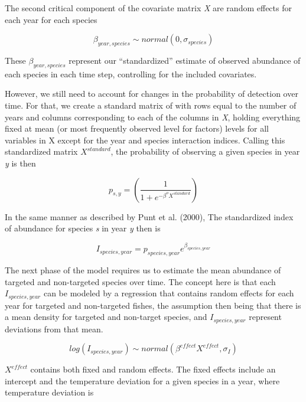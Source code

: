 \documentclass[]{article}
\begin{document}
The second critical component of the covariate matrix \emph{X} are random effects for each year for each species

\begin{equation}
  \beta_{year,species} \sim normal(0,\sigma_{species})
  \label{eq:species}
\end{equation}

These \(\beta_{year,species}\) represent our ``standardized'' estimate of observed abundance of each species in each time step, controlling for the included covariates.

However, we still need to account for changes in the probability of detection over time. For that, we create a standard matrix of with rows equal to the number of years and columns corresponding to each of the columns in \emph{X}, holding everything fixed at mean (or most frequently observed level for factors) levels for all variables in X except for the year and species interaction indices. Calling this standardized matrix \(X^{standard}\), the probability of observing a given species in year \emph{y} is then

\begin{equation}
p_{s,y} = (\frac{1}{1 +e^{-\beta^{o}{X^{standard}}}})
  \label{eq:pdetect}
\end{equation}

In the same manner as described by Punt et al. (2000), The standardized index of abundance for species \emph{s} in year \emph{y} then is

\begin{equation}
I_{species,year} = p_{species,year}e^{\beta_{species,year}}
  \label{eq:index}
\end{equation}

The next phase of the model requires us to estimate the mean abundance of targeted and non-targeted species over time. The concept here is that each \(I_{species,year}\) can be modeled by a regression that contains random effects for each year for targeted and non-targeted fishes, the assumption then being that there is a mean density for targeted and non-target species, and \(I_{species,year}\) represent deviations from that mean.

\begin{equation}
log(I_{species,year}) \sim normal(\beta^{effect}X^{effect}, \sigma_I)
  \label{eq:indexprior}
\end{equation}

\(X^{effect}\) contains both fixed and random effects. The fixed effects include an intercept and the temperature deviation for a given species in a year, where temperature deviation is
\end{document}

